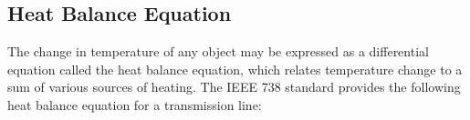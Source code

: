 \documentclass[journal,twoside]{IEEEtran}
\begin{document}





%


%
%


\subsection{Heat Balance Equation}
The change in temperature of any object may be expressed as a differential equation called the heat balance equation, which relates temperature change to a sum of various sources of heating. The IEEE 738 standard \cite{ieee2013} provides the following heat balance equation for a transmission line:
\end{document}

